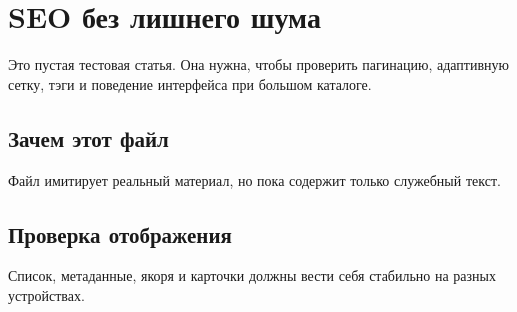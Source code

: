 \section{SEO без лишнего шума}

Это пустая тестовая статья. Она нужна, чтобы проверить пагинацию, адаптивную сетку, тэги и поведение интерфейса при большом каталоге.

\subsection{Зачем этот файл}

Файл имитирует реальный материал, но пока содержит только служебный текст.

\subsection{Проверка отображения}

Список, метаданные, якоря и карточки должны вести себя стабильно на разных устройствах.
